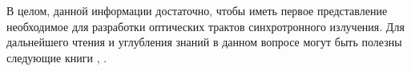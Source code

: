 В целом, данной информации достаточно, чтобы иметь первое представление необходимое для разработки оптических трактов синхротронного излучения. Для дальнейшего чтения и углубления знаний в данном вопросе могут быть полезны следующие книги \cite{als2011elements}, \cite{authier2006dynamical}.


\iffalse
